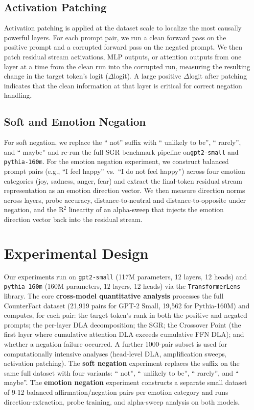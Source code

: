 \documentclass[11pt]{article}
\begin{document}
\subsection{Activation Patching}
Activation patching is applied at the dataset scale to localize the most causally powerful layers. For each prompt pair, we run a clean forward pass on the positive prompt and a corrupted forward pass on the negated prompt. We then patch residual stream activations, MLP outputs, or attention outputs from one layer at a time from the clean run into the corrupted run, measuring the resulting change in the target token's logit ($\Delta$logit). A large positive $\Delta$logit after patching indicates that the clean information at that layer is critical for correct negation handling.

\subsection{Soft and Emotion Negation}
For soft negation, we replace the `` not'' suffix with `` unlikely to be'', `` rarely'', and `` maybe'' and re-run the full SGR benchmark pipeline on\texttt{gpt2-small} and \texttt{pythia-160m}. For the emotion negation experiment, we construct balanced prompt pairs (e.g., ``I feel happy'' vs.~``I do not feel happy'') across four emotion categories (joy, sadness, anger, fear) and extract the final-token residual stream representation as an emotion direction vector. We then measure direction norms across layers, probe accuracy, distance-to-neutral and distance-to-opposite under negation, and the R$^2$ linearity of an alpha-sweep that injects the emotion direction vector back into the residual stream.

\section{Experimental Design}
\label{sec:pipeline}

Our experiments run on \texttt{gpt2-small} (117M parameters, 12 layers, 12 heads) and \texttt{pythia-160m} (160M parameters, 12 layers, 12 heads) via the \texttt{TransformerLens} \citep{nanda2022} library. The core \textbf{cross-model quantitative analysis} processes the full CounterFact dataset (21,919 pairs for GPT-2 Small, 19,562 for Pythia-160M) and computes, for each pair: the target token's rank in both the positive and negated prompts; the per-layer DLA decomposition; the SGR; the Crossover Point (the first layer where cumulative attention DLA exceeds cumulative FFN DLA); and whether a negation failure occurred. A further 1000-pair subset is used for computationally intensive analyses (head-level DLA, amplification sweeps, activation patching). The \textbf{soft negation} experiment replaces the suffix on the same full dataset with four variants: `` not'', `` unlikely to be'', `` rarely'', and `` maybe''. The \textbf{emotion negation} experiment constructs a separate small dataset of 9-12 balanced affirmation/negation pairs per emotion category and runs direction-extraction, probe training, and alpha-sweep analysis on both models.
\end{document}

